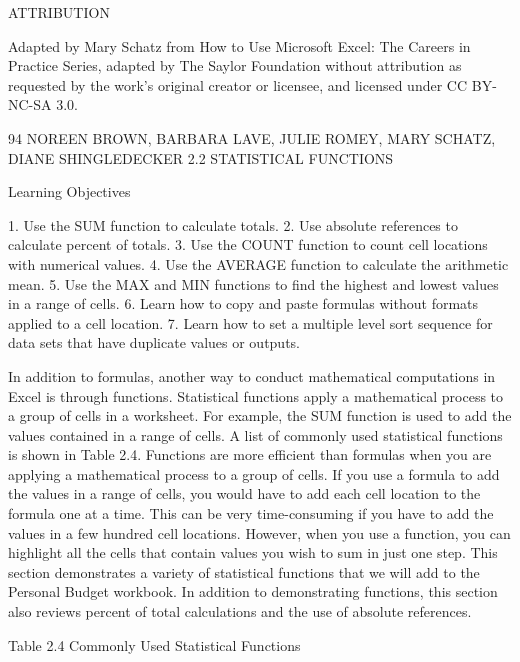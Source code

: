 ATTRIBUTION

Adapted by Mary Schatz from How to Use Microsoft Excel: The Careers in Practice Series, adapted
by The Saylor Foundation without attribution as requested by the work’s original creator or
licensee, and licensed under CC BY-NC-SA 3.0.




94 NOREEN BROWN, BARBARA LAVE, JULIE ROMEY, MARY SCHATZ, DIANE SHINGLEDECKER
2.2 STATISTICAL FUNCTIONS




Learning Objectives


1. Use the SUM function to calculate totals.
2. Use absolute references to calculate percent of totals.
3. Use the COUNT function to count cell locations with numerical values.
4. Use the AVERAGE function to calculate the arithmetic mean.
5. Use the MAX and MIN functions to find the highest and lowest values in a range of cells.
6. Learn how to copy and paste formulas without formats applied to a cell location.
7. Learn how to set a multiple level sort sequence for data sets that have duplicate values or outputs.



In addition to formulas, another way to conduct mathematical computations in Excel is through
functions. Statistical functions apply a mathematical process to a group of cells in a worksheet. For
example, the SUM function is used to add the values contained in a range of cells. A list of commonly
used statistical functions is shown in Table 2.4. Functions are more efficient than formulas when
you are applying a mathematical process to a group of cells. If you use a formula to add the values
in a range of cells, you would have to add each cell location to the formula one at a time. This can
be very time-consuming if you have to add the values in a few hundred cell locations. However,
when you use a function, you can highlight all the cells that contain values you wish to sum in just
one step. This section demonstrates a variety of statistical functions that we will add to the Personal
Budget workbook. In addition to demonstrating functions, this section also reviews percent of total
calculations and the use of absolute references.

Table 2.4 Commonly Used Statistical Functions




